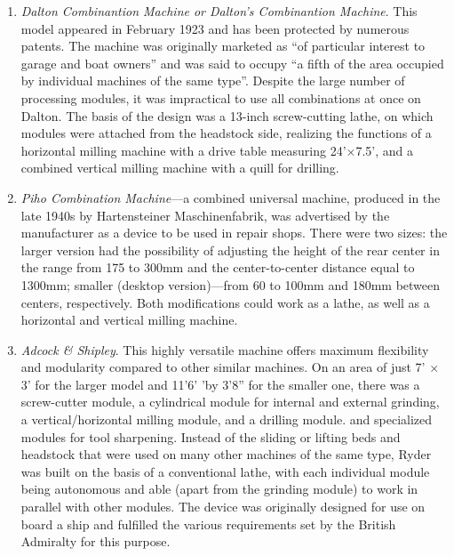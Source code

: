 \begin{enumerate}
	\item\textit{Dalton Combinantion Machine or Dalton's Combinantion Machine}. This model appeared in February 1923 and has been protected by numerous patents. The machine was originally marketed as ``of particular interest to garage and boat owners'' and was said to occupy ``a fifth of the area occupied by individual machines of the same type''. Despite the large number of processing modules, it was impractical to use all combinations at once on Dalton. The basis of the design was a 13-inch screw-cutting lathe, on which modules were attached from the headstock side, realizing the functions of a horizontal milling machine with a drive table measuring 24'$\times$7.5', and a combined vertical milling machine with a quill for drilling.
	\item\textit{Piho Combination Machine}---a combined universal machine, produced in the late 1940s by Hartensteiner Maschinenfabrik, was advertised by the manufacturer as a device to be used in repair shops. There were two sizes: the larger version had the possibility of adjusting the height of the rear center in the range from 175 to 300\:mm and the center-to-center distance equal to 1300\:mm; smaller (desktop version)---from 60 to 100\:mm and 180\:mm between centers, respectively. Both modifications could work as a lathe, as well as a horizontal and vertical milling machine.
	\item\textit{Adcock \& Shipley}. This highly versatile machine offers maximum flexibility and modularity compared to other similar machines. On an area of just 7' $\times$ 3' for the larger model and 11'6' 'by 3'8'' for the smaller one, there was a screw-cutter module, a cylindrical module for internal and external grinding, a vertical/horizontal milling module, and a drilling module. and specialized modules for tool sharpening. Instead of the sliding or lifting beds and headstock that were used on many other machines of the same type, Ryder was built on the basis of a conventional lathe, with each individual module being autonomous and able (apart from the grinding module) to work in parallel with other modules. The device was originally designed for use on board a ship and fulfilled the various requirements set by the British Admiralty for this purpose.
\end{enumerate}


